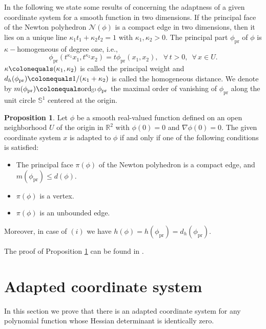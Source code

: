 \documentclass[a4paper, 11pt]{article}
\theoremstyle{plain}
\theoremstyle{definition}
\theoremstyle{lemma}
\theoremstyle{Remark}
\theoremstyle{proposition}
\newtheorem{proposition}[theorem]{Proposition}
\theoremstyle{corollary}
\theoremstyle{example}
\theoremstyle{assumption}
\begin{document}
In the following  we state some results of \cite{Adap} concerning the adaptness of a given coordinate system for a smooth function in two dimensions. If the principal face of the Newton polyhedron $\mathcal{N}(\phi)$  is a compact edge in two dimensions, then it lies on a unique line $\kappa_1 t_1+\kappa_2 t_2=1$ with $\kappa_1,\kappa_2>0.$  The principal part $\phi_{\text{pr}}$ of $\phi$ is $\kappa-$homogeneous of degree one, i.e.,
$$\phi_{\text{pr}}(t^{\kappa_1}x_1,t^{\kappa_2}x_2)=t\phi_{\text{pr}}(x_1,x_2),\,\,\,\, \forall\,t>0, \,\,\,\forall\, x\in U. $$
$\kappa\colonequals(\kappa_1,\kappa_2)$ is called the principal weight and $d_h(\phi_{\text{pr}})\colonequals 1/(\kappa_1+\kappa_2)$ is called the homogeneous distance. We denote by $m(\phi_{\text{pr}})\colonequals \text{ord}_{\mathbb{S}^1}\phi_{\text{pr}}$
the maximal order of vanishing of $\phi_{\text{pr}}$ along the unit circle $\mathbb{S}^1$ centered at the origin.
\begin{proposition}\label{pr:a} %
Let $\phi$ be a smooth real-valued function defined on an open neighborhood $U$ of the origin in $\mathbb{R}^2$ with $\phi(0)=0$ and $\nabla \phi(0)=0.$ The given coordinate system  $x$ is adapted to $\phi$ if and only if one of the following conditions is satisfied:
\begin{itemize}
\item[(i)] The principal face $\pi (\phi)$ of the Newton polyhedron is a compact edge, and $m(\phi_{\mathrm{pr}})\leq d(\phi).$
\item[(ii)] $\pi (\phi)$ is a vertex.
\item[(iii)] $\pi (\phi)$ is an unbounded edge.
\end{itemize}
Moreover, in case of $(i)$ we have $h(\phi)=
h(\phi_{\mathrm{pr}})=
d_h(\phi_{\mathrm{pr}}).$
\end{proposition}
The proof of Proposition \ref{pr:a} can be found in \cite{Adap}.


\section{Adapted coordinate system}



In this section we prove that there is an adapted coordinate system for any polynomial function whose Hessian determinant is identically zero.
\end{document}
